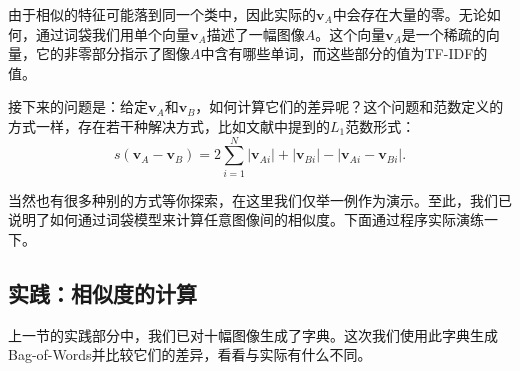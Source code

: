 由于相似的特征可能落到同一个类中，因此实际的$\bm{v}_A$中会存在大量的零。无论如何，通过词袋我们用单个向量$\bm{v}_A$描述了一幅图像$A$。这个向量$\bm{v}_A$是一个稀疏的向量，它的非零部分指示了图像$A$中含有哪些单词，而这些部分的值为TF-IDF的值。

接下来的问题是：给定$\bm{v}_A$和$\bm{v}_B$，如何计算它们的差异呢？这个问题和范数定义的方式一样，存在若干种解决方式，比如文献\cite{Nister2006}中提到的$L_1$范数形式：
\begin{equation}
s\left( {{\bm{v}_A} - {\bm{v}_B}} \right) = 2\sum\limits_{i = 1}^N {\left| {{\bm{v}_{Ai}}} \right| + \left| {{\bm{v}_{Bi}}} \right| - \left| {{\bm{v}_{Ai}} - {\bm{v}_{Bi}}} \right|}.
\end{equation}

当然也有很多种别的方式等你探索，在这里我们仅举一例作为演示。至此，我们已说明了如何通过词袋模型来计算任意图像间的相似度。下面通过程序实际演练一下。

\subsection{实践：相似度的计算}
上一节的实践部分中，我们已对十幅图像生成了字典。这次我们使用此字典生成Bag-of-Words并比较它们的差异，看看与实际有什么不同。

